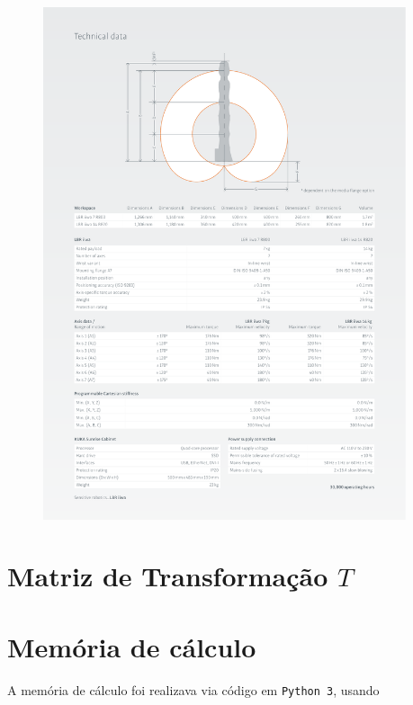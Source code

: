\documentclass[a4paper]{ifacconf}
\begin{document}
\begin{figure}[H]
    \centering
    \includegraphics[width=0.95\textwidth]{Imagem/Dim.pdf}
\end{figure}
%
\section{Matriz de Transformação \ensuremath{T}}\label{apend:MatrizT}


\newpage
\section{Memória de cálculo}\label{apend:memoria_calculo}
A memória de cálculo foi realizava via código em \texttt{Python 3}, usando

\end{document}
